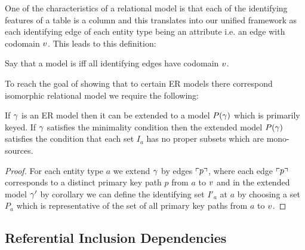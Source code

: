 One of the characteristics of a relational model is that each of the identifying features of a table is a column
and this translates into our unified framework as each identifying edge of each entity type being an attribute i.e. 
an edge with codomain $v$. This leads to this definition: 
\begin{definition}
Say that a model is  iff all identifying edges 
have codomain $v$.
\end{definition}
To reach the goal of showing that to certain ER models there correspond isomorphic relational model we require the following:
\begin{lemma}
If $\gamma$ is an ER model then it can be extended to a model $P(\gamma)$
which is primarily keyed. If $\gamma$ satisfies the minimality condition then the
extended model $P(\gamma)$ satisfies the  condition that each set $I_a$ has no proper subsets which are mono-sources. 
\end{lemma}
\begin{proof}
For each entity type $a$ we extend $\gamma$ by edges $\left\ulcorner p\right\urcorner$, where each edge 
$\left\ulcorner p\right\urcorner$ corresponds to a distinct primary key path $p$ from $a$ to $v$
and in the extended model $\gamma'$ by corollary  
we can define the identifying set $I'_a$ at $a$ by choosing a set $P_a$ which is representative of the set of all primary key paths from $a$ to $v$.
\end{proof}

\subsection{Referential Inclusion Dependencies}

